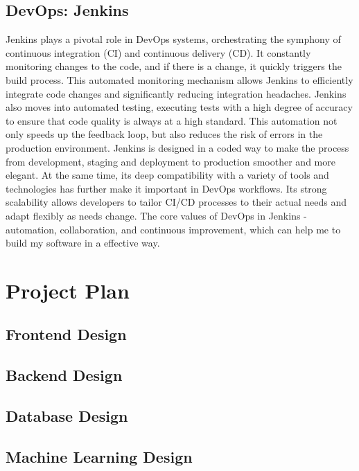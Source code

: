 \documentclass[12pt,two side]{report}
\begin{document}
\section{DevOps: Jenkins}
Jenkins plays a pivotal role in DevOps systems, orchestrating the symphony of continuous integration (CI) and continuous delivery (CD). It constantly monitoring changes to the code, and if there is a change, it quickly triggers the build process. This automated monitoring mechanism allows Jenkins to efficiently integrate code changes and significantly reducing integration headaches. Jenkins also moves into automated testing, executing tests with a high degree of accuracy to ensure that code quality is always at a high standard. This automation not only speeds up the feedback loop, but also reduces the risk of errors in the production environment. Jenkins is designed in a coded way to make the process from development, staging and deployment to production smoother and more elegant. At the same time, its deep compatibility with a variety of tools and technologies has further make it important in DevOps workflows. Its strong scalability allows developers to tailor CI/CD processes to their actual needs and adapt flexibly as needs change. The core values of DevOps in Jenkins - automation, collaboration, and continuous improvement, which can help me to build my software in a effective way.

\chapter{Project Plan}
\section{Frontend Design}
\section{Backend Design}
\section{Database Design}
\section{Machine Learning Design}




\end{document}
